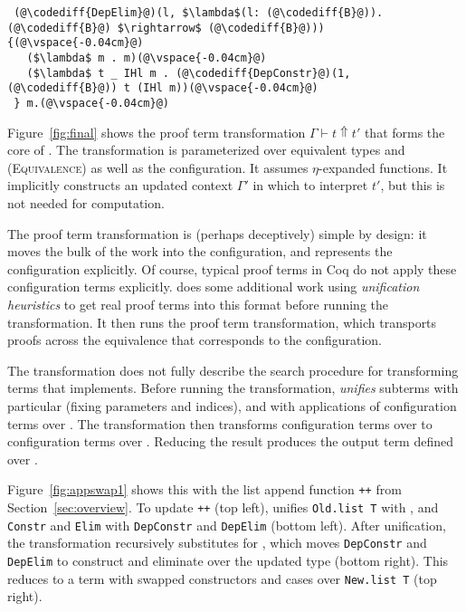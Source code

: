 \begin{figure*}
\begin{minipage}{0.49\textwidth}
\begin{lstlisting}
 (@\codediff{DepElim}@)(l, $\lambda$(l: (@\codediff{B}@)).(@\codediff{B}@) $\rightarrow$ (@\codediff{B}@))) {(@\vspace{-0.04cm}@)
   ($\lambda$ m . m)(@\vspace{-0.04cm}@)
   ($\lambda$ t _ IHl m . (@\codediff{DepConstr}@)(1, (@\codediff{B}@)) t (IHl m))(@\vspace{-0.04cm}@)
 } m.(@\vspace{-0.04cm}@)
\end{lstlisting}
\end{minipage}
\vspace{-0.3cm}
\caption{Swapping cases of the append function, counterclockwise, the input term: 1) unmodified, 2) unified with the configuration, 3) ported to the updated type, and 4) reduced to the output.}
\label{fig:appswap1}
\end{figure*}

Figure~\ref{fig:final} shows the proof term transformation $\Gamma \vdash t \Uparrow t'$ that forms the core of \toolname.
The transformation is parameterized over equivalent types \A and \B (\textsc{Equivalence})
as well as the configuration. %
It assumes $\eta$-expanded functions.
It implicitly constructs an updated context $\Gamma'$ in which to interpret $t'$, but this is not needed for computation.

The proof term transformation is (perhaps deceptively) simple by design:
it moves the bulk of the work into the configuration,
and represents the configuration explicitly.
Of course, typical proof terms in Coq do not apply these configuration
terms explicitly.
\toolname does some additional work using \textit{unification heuristics} to get real proof terms into this format before running the transformation.
It then runs the proof term transformation, which transports proofs across the equivalence that corresponds to the configuration.

The transformation does not fully describe the search procedure for transforming terms that \toolname implements.
Before running the transformation, \toolname \textit{unifies} subterms with particular \A (fixing parameters and indices),
and with applications of configuration terms over \A. 
The transformation then transforms configuration terms over \A
to configuration terms over \B.
Reducing the result produces the output term defined over \B.

Figure~\ref{fig:appswap1} shows this with the list append function \lstinline{++} from Section~\ref{sec:overview}.
To update \lstinline{++} (top left), \toolname unifies \lstinline{Old.list T} with \A, and \lstinline{Constr} and \lstinline{Elim}
with \lstinline{DepConstr} and \lstinline{DepElim} (bottom left).
After unification, the transformation recursively substitutes \B
for \A, which moves \lstinline{DepConstr} and \lstinline{DepElim}
to construct and eliminate over the updated type (bottom right).
This reduces to a term with swapped constructors and cases over \lstinline{New.list T} (top right).

